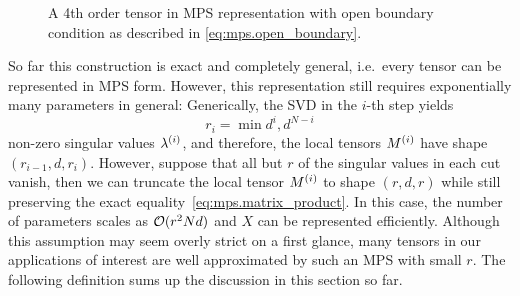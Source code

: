 \begin{figure*}
  \centering
  \caption{%
    \label{fig:mps.mps}
    A 4th order tensor in MPS representation with open boundary condition as described in \cref{eq:mps.open_boundary}.
  }
\end{figure*}

So far this construction is exact and completely general, i.e.\ every tensor can be represented in MPS form.
However, this representation still requires exponentially many parameters in general:
Generically, the SVD in the $i$-th step yields
\[
  \label{eq:mps.generic_ranks}
  r_i = \min{d^i, d^{N - i}}
\]
non-zero singular values $\lambda^{(i)}$, and therefore, the local tensors $M^{(i)}$ have shape $(r_{i-1}, d, r_i)$.
However, suppose that all but $r$ of the singular values in each cut vanish, then we can truncate the local tensor $M^{(i)}$ to shape $(r, d, r)$ while still preserving the exact equality~\eqref{eq:mps.matrix_product}.
In this case, the number of parameters scales as ${\mathcal{O}}(r^2 N d)$ and $X$ can be represented efficiently.
Although this assumption may seem overly strict on a first glance, many tensors in our applications of interest are well approximated by such an MPS with small $r$.
The following definition sums up the discussion in this section so far.


